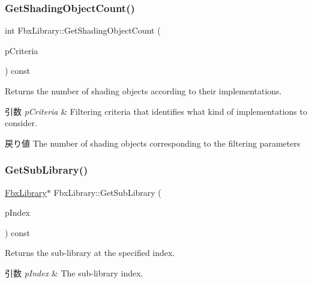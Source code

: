 \mbox{\label{class_fbx_library_a5b43bbc0e02d7d48628c2dc18980fdd8}} 
\subsubsection{\texorpdfstring{Get\+Shading\+Object\+Count()}{GetShadingObjectCount()}\hspace{0.1cm}{\footnotesize\ttfamily [2/2]}}
{\footnotesize\ttfamily int Fbx\+Library\+::\+Get\+Shading\+Object\+Count (\begin{DoxyParamCaption}\item[{const \hyperlink{class_fbx_implementation_filter}{Fbx\+Implementation\+Filter} \&}]{p\+Criteria }\end{DoxyParamCaption}) const}

Returns the number of shading objects according to their implementations. 
\begin{DoxyParams}{引数}
{\em p\+Criteria} & Filtering criteria that identifies what kind of implementations to consider. \\
\hline
\end{DoxyParams}
\begin{DoxyReturn}{戻り値}
The number of shading objects corresponding to the filtering parameters 
\end{DoxyReturn}
\mbox{\label{class_fbx_library_a3a6f41a432b2f0db2966f51d8ccc511e}} 
\subsubsection{\texorpdfstring{Get\+Sub\+Library()}{GetSubLibrary()}}
{\footnotesize\ttfamily \hyperlink{class_fbx_library}{Fbx\+Library}$\ast$ Fbx\+Library\+::\+Get\+Sub\+Library (\begin{DoxyParamCaption}\item[{int}]{p\+Index }\end{DoxyParamCaption}) const}

Returns the sub-\/library at the specified index. 
\begin{DoxyParams}{引数}
{\em p\+Index} & The sub-\/library index. \\
\hline
\end{DoxyParams}
\mbox{\label{class_fbx_library_aa5c3590309cfdf028cf367f6d9431ce2}} 
